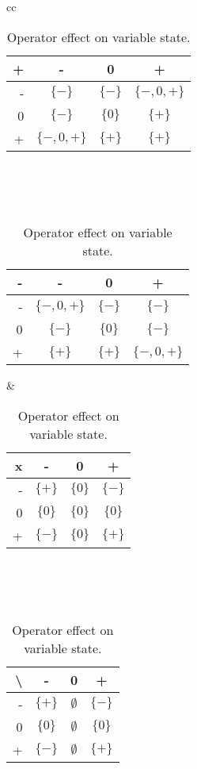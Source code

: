 \begin{table}
\begin{tabular}{cc}
    \begin{minipage}{0.4\linewidth}
		\begin{tabular}{| r | c | c | c |}
		\hline
		 \textbf{+}   & -           & 0 & + \\
		\hline
		 -  & $\{-\}$     & $\{-\}$ & $\{-,0,+\}$ \\
		\hline
		 0  & $\{-\}$     & $\{0\}$ & $\{+\}$ \\
		\hline
		 +  & $\{-,0,+\}$ & $\{+\}$ & $\{+\}$ \\
		\hline
		\end{tabular}
		\\\\\\
		\begin{tabular}{| r | c | c | c |}
		\hline
		  \textbf{-}  & -           & 0 & + \\
		\hline
		 -  & $\{-,0,+\}$ & $\{-\}$ & $\{-\}$ \\
		\hline
		 0  & $\{-\}$     & $\{0\}$ & $\{-\}$ \\
		\hline
		 +  & $\{+\}$     & $\{+\}$ & $\{-,0,+\}$ \\
		\hline
		\end{tabular}
    \end{minipage} &

    \begin{minipage}{0.4\linewidth}
		\begin{tabular}{| r | c | c | c |}
		\hline
		 \textbf{x}   & -           & 0 & + \\
		\hline
		 -  & $\{+\}$ & $\{0\}$ & $\{-\}$ \\
		\hline
		 0  & $\{0\}$ & $\{0\}$ & $\{0\}$ \\
		\hline
		 +  & $\{-\}$ & $\{0\}$ & $\{+\}$ \\
		\hline
		\end{tabular}
		\\\\\\
		\begin{tabular}{| r | c | c | c |}
		\hline
		 \textbf{\textbackslash}   & -           & 0 & + \\
		\hline
		 -  & $\{+\}$ & $\emptyset$ & $\{-\}$ \\
		\hline
		 0  & $\{0\}$ & $\emptyset$ & $\{0\}$ \\
		\hline
		 +  & $\{-\}$ & $\emptyset$ & $\{+\}$ \\
		\hline
		\end{tabular}
    \end{minipage}
\end{tabular}
\centering
\caption{Operator effect on variable state.}
\label{table:arithmetic_operators}
\end{table}


